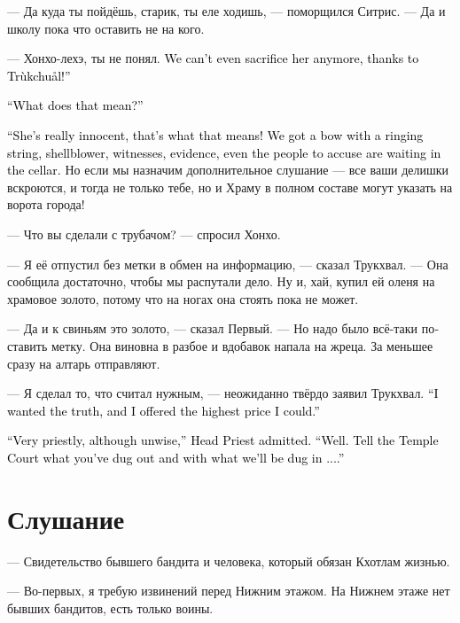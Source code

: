 \documentclass[a4paper,12pt,fleqn]{book}\usepackage{cooltooltips}\usepackage{polyglossia}\setdefaultlanguage{russian}\setotherlanguage{english}\defaultfontfeatures{Ligatures=TeX,Mapping=tex-text} \usepackage{xcolor}\definecolor{lightgray}{HTML}{bbbbbb}\color{lightgray}\newcommand{\ml}[3]{\textenglish{\textcolor{black}{#3}}}
\newcommand{\Trukchual}{Tr\`{u}kchu\r{a}l}
\begin{document}
--- Да куда ты пойдёшь, старик, ты еле ходишь, --- поморщился Ситрис.
--- Да и школу пока что оставить не на кого.

--- Хонхо-лехэ, ты не понял.
\ml{$0$}
{Мы её и в жертву теперь принести не можем --- благодаря Трукхвалу!}
{We can't even sacrifice her anymore, thanks to \Trukchual!''}

\ml{$0$}
{--- Что это значит?}
{``What does that mean?''}

\ml{$0$}
{--- Она действительно невиновна --- вот что это значит!}
{``She's really innocent, that's what that means!}
\ml{$0$}
{Есть лук со звенящей тетивой, трубач, свидетели, улики, даже обвиняемые уже ждут в подвале.}
{We got a bow with a ringing string, shellblower, witnesses, evidence, even the people to accuse are waiting in the cellar.}
Но если мы назначим дополнительное слушание --- все ваши делишки вскроются, и тогда не только тебе, но и Храму в полном составе могут указать на ворота города!

--- Что вы сделали с трубачом? --- спросил Хонхо.

--- Я её отпустил без метки в обмен на информацию, --- сказал Трукхвал.
--- Она сообщила достаточно, чтобы мы распутали дело.
Ну и, хай, купил ей оленя на храмовое золото, потому что на ногах она стоять пока не может.

--- Да и к свиньям это золото, --- сказал Первый.
--- Но надо было всё-таки поставить метку.
Она виновна в разбое и вдобавок напала на жреца.
За меньшее сразу на алтарь отправляют.

--- Я сделал то, что считал нужным, --- неожиданно твёрдо заявил Трукхвал.
\ml{$0$}
{--- Мне нужна была истина, и я предложил за неё самую высокую цену, какую мог предложить.}
{``I wanted the truth, and I offered the highest price I could.''}

\ml{$0$}
{--- Очень по-жречески, хоть и недальновидно, --- признал Первый.}
{``Very priestly, although unwise,'' Head Priest admitted.}
\ml{$0$}
{--- Ладно.}
{``Well.}
\ml{$0$}
{Выкладывай Совету Храма, что накопал и чем нас закопают...}
{Tell the Temple Court what you've dug out and with what we'll be dug in ....''}

\section{Слушание}

--- Свидетельство бывшего бандита и человека, который обязан Кхотлам жизнью.

--- Во-первых, я требую извинений перед Нижним этажом.
На Нижнем этаже нет бывших бандитов, есть только воины.
\end{document}

